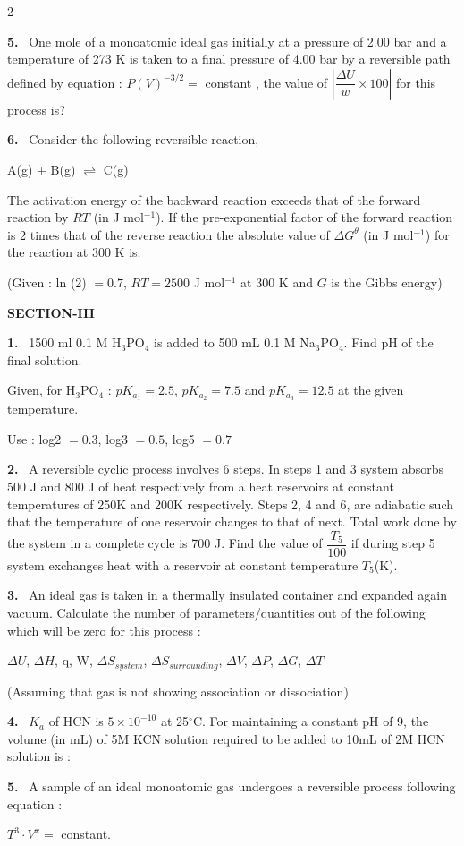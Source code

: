 \documentclass[10pt]{extarticle}
\newcommand{\sect}[1]{\par\smallskip\noindent\textbf{#1}\par}
\newcommand{\qn}[1]{\par\smallskip\noindent\textbf{#1.}~}
\begin{document}
\begin{multicols}{2}
\qn{5} One mole of a monoatomic ideal gas initially at a pressure of 2.00 bar and a temperature of 273 K is taken to a final pressure of 4.00 bar by a reversible path defined by equation : $P(V)^{-3/2}=$ constant , the value of $\left|\dfrac{\Delta U}{w}\times100\right|$ for this process is?
\qn{6} Consider the following reversible reaction,\par
A(g) + B(g) $\rightleftharpoons$ C(g)\par
The activation energy of the backward reaction exceeds that of the forward reaction by $RT$ (in J mol$^{-1}$). If the pre-exponential factor of the forward reaction is 2 times that of the reverse reaction the absolute value of $\Delta G^\theta$ (in J mol$^{-1}$) for the reaction at 300 K is.\par
(Given : ln (2) $=0.7$, $RT=2500$ J mol$^{-1}$ at 300 K and $G$ is the Gibbs energy)
\sect{SECTION-III}
\qn{1} 1500 ml 0.1 M H$_3$PO$_4$ is added to 500 mL 0.1 M Na$_3$PO$_4$. Find pH of the final solution.\par
Given, for H$_3$PO$_4$ : $pK_{a_1}=2.5$, $pK_{a_2}=7.5$ and $pK_{a_3}=12.5$ at the given temperature.\par
Use : log2 $=0.3$, log3 $=0.5$, log5 $=0.7$
\qn{2} A reversible cyclic process involves 6 steps. In steps 1 and 3 system absorbs 500 J and 800 J of heat respectively from a heat reservoirs at constant temperatures of 250K and 200K respectively. Steps 2, 4 and 6, are adiabatic such that the temperature of one reservoir changes to that of next. Total work done by the system in a complete cycle is 700 J. Find the value of $\dfrac{T_5}{100}$ if during step 5 system exchanges heat with a reservoir at constant temperature $T_5$(K).
\qn{3} An ideal gas is taken in a thermally insulated container and expanded again vacuum. Calculate the number of parameters/quantities out of the following which will be zero for this process :\par
$\Delta U$, $\Delta H$, q, W, $\Delta S_{system}$, $\Delta S_{surrounding}$, $\Delta V$, $\Delta P$, $\Delta G$, $\Delta T$\par
(Assuming that gas is not showing association or dissociation)
\qn{4} $K_a$ of HCN is $5\times10^{-10}$ at 25$^\circ$C. For maintaining a constant pH of 9, the volume (in mL) of 5M KCN solution required to be added to 10mL of 2M HCN solution is :
\qn{5} A sample of an ideal monoatomic gas undergoes a reversible process following equation :\par
$T^3\cdot V^x=$ constant.
\begin{center}

\end{center}
\end{multicols}
\end{document}
